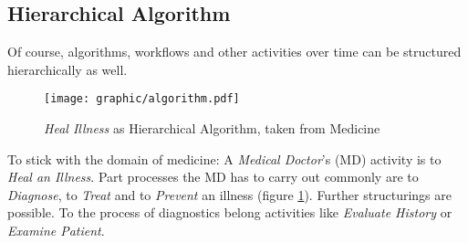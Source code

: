 %
%
%
%
%
%
%

\subsection{Hierarchical Algorithm}
\label{hierarchical_algorithm_heading}

Of course, algorithms, workflows and other activities over time can be
structured hierarchically as well.

\begin{figure}[ht]
    \begin{center}
        \texttt{[image: graphic/algorithm.pdf]}
        \caption{\emph{Heal Illness} as Hierarchical Algorithm, taken from Medicine}
        \label{algorithm_figure}
    \end{center}
\end{figure}

To stick with the domain of medicine: A \emph{Medical Doctor}'s (MD) activity
is to \emph{Heal an Illness}. Part processes the MD has to carry out commonly
are to \emph{Diagnose}, to \emph{Treat} and to \emph{Prevent} an illness
(figure \ref{algorithm_figure}). Further structurings are possible. To the
process of diagnostics belong activities like \emph{Evaluate History} or
\emph{Examine Patient}.
